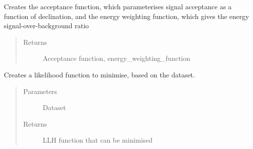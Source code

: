 \documentclass[letterpaper,10pt,english]{sphinxmanual}
\begin{document}
\begin{fulllineitems}
\begin{fulllineitems}
\end{fulllineitems}


\begin{fulllineitems}
\label{\detokenize{index:flarestack.core.llh.StandardLLH.create_energy_functions}}
Creates the acceptance function, which parameterises signal
acceptance as a function of declination, and the energy weighting
function, which gives the energy signal-over-background ratio
\begin{quote}\begin{description}
\item[{Returns}] \leavevmode
Acceptance function, energy\_weighting\_function

\end{description}\end{quote}

\end{fulllineitems}


\begin{fulllineitems}
\label{\detokenize{index:flarestack.core.llh.StandardLLH.create_kwargs}}
Creates a likelihood function to minimise, based on the dataset.
\begin{quote}\begin{description}
\item[{Parameters}] \leavevmode
{} \textendash{} Dataset

\item[{Returns}] \leavevmode
LLH function that can be minimised

\end{description}\end{quote}

\end{fulllineitems}



\end{fulllineitems}
\end{document}
